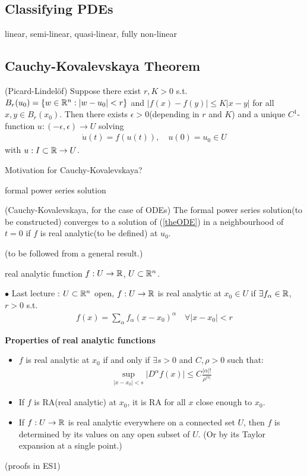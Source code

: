 \documentclass[10pt,a4paper]{report}
\begin{document}
\subsection*{Classifying PDEs}

linear, semi-linear, quasi-linear, fully non-linear

\subsection*{Cauchy-Kovalevskaya Theorem}

\thm (Picard-Lindel\"{o}f) Suppose there exist $r,K>0$ s.t. $B_r(u_0) = \{ w\in \mathbb{R}^n : |w-u_0|<r\}$ and $|f(x)-f(y)| \leq K|x-y|$ for all $x,y \in B_r(x_0)$. Then there exists $\epsilon >0$(depending in $r$ and $K$) and a unique $C^1$-function $u : (-\epsilon,\epsilon)\rightarrow U$ solving
\begin{align}
\dot{u}(t) = f(u(t)), \quad u(0)= u_0 \in U \label{theODE}
\end{align}
with $u: I\subset \mathbb{R} \rightarrow U$.
\s

Motivation for Cauchy-Kovalevskaya?

formal power series solution
\s

\thm(Cauchy-Kovalevskaya, for the case of ODEs) The formal power series solution(to be constructed) converges to a solution of (\ref{theODE}) in a neighbourhood of $t=0$ if $f$ is real analytic(to be defined) at $u_0$.

(to be followed from a general result.)
\s

 real analytic function $f: U\rightarrow \mathbb{R}$, $U\subset \mathbb{R}^n$.
\s
\s

$\bullet$ Last lecture : $U \subset \mathbb{R}^n$ open, $f: U \rightarrow \mathbb{R}$ is real analytic at $x_0 \in U$ if $\exists f_{\alpha} \in \mathbb{R}$, $r>0$ s.t.
\begin{align*}
f(x)  = \sum_{\alpha} f_{\alpha}(x-x_0)^{\alpha} \quad \forall |x-x_0|<r
\end{align*}
\s

\textbf{Properties of real analytic functions}
\begin{itemize}
\item $f$ is real analytic at $x_0$ if and only if $\exists s>0$ and $C,\rho>0$ such that:
\begin{align*}
\sup_{|x-x_0|< s}\big| D^{\alpha}f(x) \big| \leq C \frac{|\alpha|!}{\rho^{|\alpha|}}
\end{align*}
\item If $f$ is RA(real analytic) at $x_0$, it is RA for all $x$ close enough to $x_0$.
\item If $f: U \rightarrow \mathbb{R}$ is real analytic everywhere on a connected set $U$, then $f$ is determined by its values on any open subset of $U$. (Or by its Taylor expansion at a single point.)
\end{itemize}
(proofs in ES1)
\s
\end{document}
